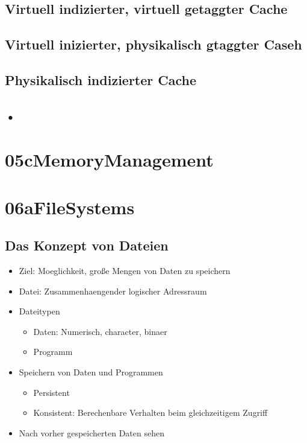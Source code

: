 \documentclass[a4paper]{scrreprt}
\begin{document}
\section{Virtuell indizierter, virtuell getaggter Cache}
\section{Virtuell inizierter, physikalisch gtaggter Caseh}
\section{Physikalisch indizierter Cache}
\section{•}

\chapter{05cMemoryManagement}
\chapter{06aFileSystems}

\section{Das Konzept von Dateien}
\begin{itemize}
	\item Ziel: Moeglichkeit, große Mengen von Daten zu speichern
	\item Datei: Zusammenhaengender logischer Adressraum
	\item Dateitypen
		\begin{itemize}
			\item Daten: Numerisch, character, binaer
			\item Programm
		\end{itemize}
	\item Speichern von Daten und Programmen
		\begin{itemize}
			\item Persistent
			\item Konsistent: Berechenbare Verhalten beim gleichzeitigem Zugriff
		\end{itemize}
	\item Nach vorher gespeicherten Daten sehen
\end{itemize}
\end{document}
